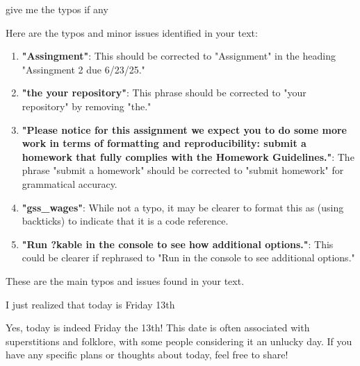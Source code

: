 \begin{userprompt}

give me the typos if any

\end{userprompt}

\begin{botresponse}

Here are the typos and minor issues identified in your text:

\begin{enumerate}
\item \textbf{"Assingment"}: This should be corrected to "Assignment" in the heading "Assingment 2 due 6/23/25."
\item \textbf{"the your repository"}: This phrase should be corrected to "your repository" by removing "the."
\item \textbf{"Please notice for this assignment we expect you to do some more work in terms of formatting and reproducibility: submit a homework that fully complies with the Homework Guidelines."}: The phrase "submit a homework" should be corrected to "submit homework" for grammatical accuracy.
\item \textbf{"gss\_wages"}: While not a typo, it may be clearer to format this as  (using backticks) to indicate that it is a code reference.
\item \textbf{"Run ?kable in the console to see how additional options."}: This could be clearer if rephrased to "Run  in the console to see additional options."
\end{enumerate}

These are the main typos and issues found in your text.

\end{botresponse}

\begin{userprompt}

I just realized that today is Friday 13th

\end{userprompt}

\begin{botresponse}

Yes, today is indeed Friday the 13th! This date is often associated with superstitions and folklore, with some people considering it an unlucky day. If you have any specific plans or thoughts about today, feel free to share!

\end{botresponse}

